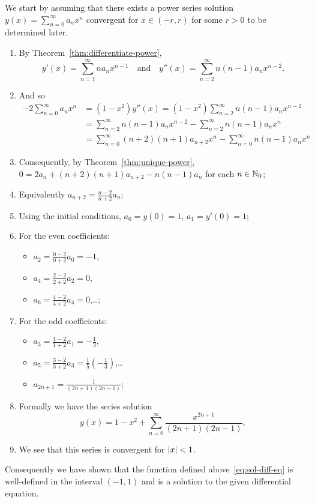 We start by assuming that there exists a power series solution \(y(x) = \sum_{n=0}^{\infty}a_n x^n\) convergent for \(x \in (-r,r)\) for some \(r>0\) to be determined later.
\begin{enumerate}
  \item
        By Theorem~\ref{thm:differentiate-power},
        \[
          y'(x) = \sum_{n=1}^{\infty}n a_n x^{n-1}
          \quad\text{and} \quad
          y''(x) = \sum_{n=2}^{\infty}n(n-1) a_n x^{n-2}.
        \]
  \item And so
        \[
          \begin{aligned}
            -2 \sum_{n=0}^{\infty}a_n x^n
              & = (1-x^2)y''(x)
            = (1-x^2) \sum_{n=2}^{\infty}n(n-1) a_n x^{n-2}                                        \\
              & = \sum_{n=2}^{\infty}n(n-1) a_n x^{n-2} - \sum_{n=2}^{\infty}n(n-1) a_n x^{n}       \\
              & = \sum_{n=0}^{\infty}(n+2)(n+1) a_{n+2} x^{n} - \sum_{n=0}^{\infty}n(n-1) a_n x^{n}
          \end{aligned}
        \]
  \item Consequently, by Theorem~\ref{thm:unique-power}, \(0 = 2a_n +  (n+2)(n+1) a_{n+2} -  n(n-1) a_n \) for each \(n \in \mathbb{N}_0\);
  \item Equivalently \(a_{n+2} = \frac{n-2}{n+2}a_n\);
  \item Using the initial conditions,  \(a_0 = y(0) = 1\), \(a_1 = y'(0) = 1\);
  \item For the even coefficients:
        \begin{itemize}
          \item \(a_2 =  \frac{0-2}{0+2}a_0 = -1\),
          \item \(a_4 =  \frac{2-2}{2+2}a_2 = 0\),
          \item  \(a_6 =  \frac{4-2}{4+2}a_4 = 0\),\ldots;
        \end{itemize}
  \item For the odd coefficients:
        \begin{itemize}
          \item \(a_3 =  \frac{1-2}{1+2}a_1 = -\frac{1}{3}\),
          \item \(a_5= \frac{3-2}{3+2}a_3 = \frac{1}{5}(-\frac{1}{3})\),\ldots
          \item \(a_{2n+1} = \frac{1}{(2n+1)(2n-1)}\);
        \end{itemize}
  \item Formally we have the series solution
        \begin{equation}
          \label{eq:sol-diff-eq}
          y(x) = 1 - x^2 + \sum_{n=0}^{\infty} \frac{x^{2n+1}}{(2n+1)(2n-1)},
        \end{equation}
  \item We see that this series is convergent for \(\left|x\right|<1\).
\end{enumerate}
%
Consequently we have shown that the function defined above~\eqref{eq:sol-diff-eq} is well-defined in the interval \((-1,1)\) and is a solution to the given differential equation.


